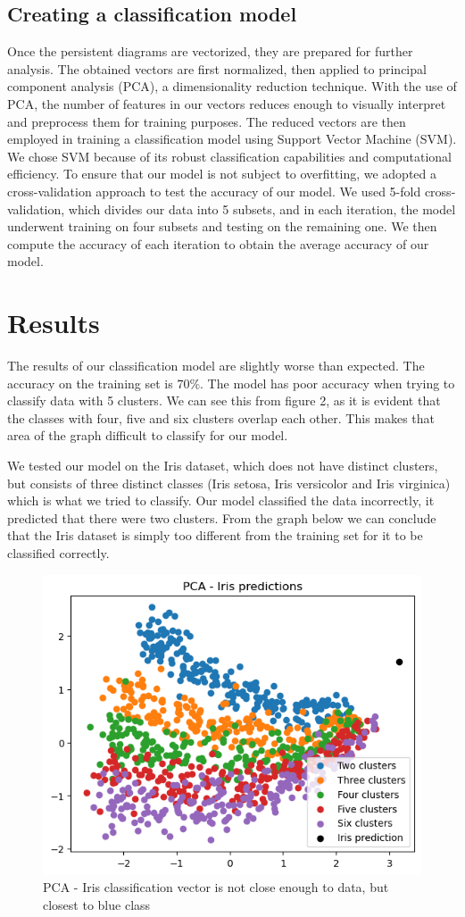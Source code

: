 \documentclass{article}
\begin{document}
\subsection{Creating a classification model}
Once the persistent diagrams are vectorized, they are prepared for further analysis. The obtained vectors are first normalized, then applied to principal component analysis (PCA), a dimensionality reduction technique. With the use of PCA, the number of features in our vectors reduces enough to visually interpret and preprocess them for training purposes. The reduced vectors are then employed in training a classification model using Support Vector Machine (SVM). We chose SVM because of its robust classification capabilities and computational efficiency. To ensure that our model is not subject to overfitting, we adopted a cross-validation approach to test the accuracy of our model. We used 5-fold cross-validation, which divides our data into 5 subsets, and in each iteration, the model underwent training on four subsets and testing on the remaining one. We then compute the accuracy of each iteration to obtain the average accuracy of our model.



\section{Results}
The results of our classification model are slightly worse than expected. The accuracy on the training set is $70\%$. The model has poor accuracy when trying to classify data with 5 clusters. We can see this from figure 2, as it is evident that the classes with four, five and six clusters overlap each other. This makes that area of the graph difficult to classify for our model.

We tested our model on the Iris dataset, which does not have distinct clusters, but consists of three distinct classes (Iris setosa, Iris versicolor and Iris virginica) which is what we tried to classify. Our model classified the data incorrectly, it predicted that there were two clusters. From the graph below we can conclude that the Iris dataset is simply too different from the training set for it to be classified correctly.

\begin{figure}[H]
    \centering
    \includegraphics[width=0.49\linewidth]{PCAIris.png}
    \caption{PCA - Iris classification vector is not close enough to data, but closest to blue class}
\end{figure}
\end{document}

